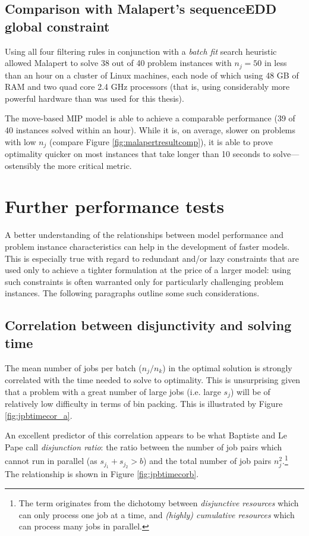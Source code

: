 \documentclass[13pt, letterpaper, oneside]{book}
\begin{document}
\subsection{Comparison with Malapert's sequenceEDD global constraint}
Using all four filtering rules in conjunction with a \textit{batch fit} search
heuristic allowed Malapert to solve 38 out of 40 problem instances with $n_j =
50$ in less than an hour on a cluster of Linux machines, each node of which
using 48 GB of RAM and two quad core 2.4 GHz processors (that is, using
considerably more powerful hardware than was used for this thesis). 

The move-based MIP model is able to achieve a comparable performance (39 of 40
instances solved within an hour). While it is, on average, slower on problems
with low $n_j$ (compare Figure \ref{fig:malapertresultcomp}), it is able to
prove optimality quicker on most instances that take longer than 10 seconds to
solve---ostensibly the more critical metric.

\section{Further performance tests}
A better understanding of the relationships between model performance and
problem instance characteristics can help in the development of faster models.
This is especially true with regard to redundant and/or lazy constraints that
are used only to achieve a tighter formulation at the price of a larger model:
using such constraints is often warranted only for particularly challenging
problem instances. The following paragraphs outline some such considerations.

\subsection{Correlation between disjunctivity and solving time}
\label{sec:disjunctivity}
The mean number of jobs per batch ($n_j/n_k$) in the optimal solution is
strongly correlated with the time needed to solve to
optimality. This is unsurprising given that a problem with a great number of large
jobs (i.e. large $s_j$) will be of relatively low
difficulty in terms of bin packing. This is illustrated by Figure
\ref{fig:jpbtimecor_a}.

An excellent predictor of this correlation appears to be what Baptiste and Le Pape
\citet{baptistelepape} call \textit{disjunction ratio}: the ratio between the
number of job pairs which cannot run in parallel (as $s_{j_1} + s_{j_2} > b$) and
the total number of job pairs $n_j^2$.\footnote{The term originates from the
dichotomy between \textit{disjunctive resources} which can only process one job
at a time, and \textit{(highly) cumulative resources} which can process many
jobs in parallel.} The relationship is shown in Figure
\ref{fig:jpbtimecorb}.
\end{document}
